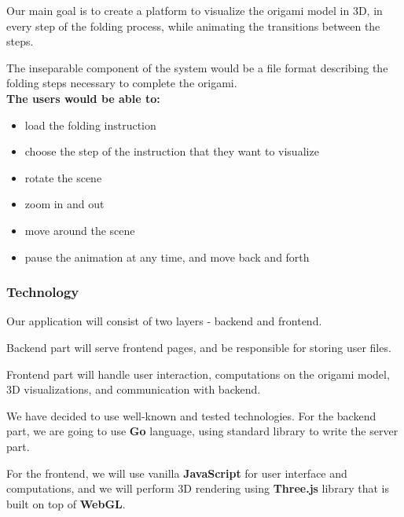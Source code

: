Our main goal is to create a platform to visualize the origami model in 3D,
in every step of the folding process, while animating the transitions between the steps.

The inseparable component of the system would be a file format describing the folding steps necessary to complete the origami.\\

\noindent \textbf{The users would be able to:}
\begin{itemize}
	\item load the folding instruction
	\item choose the step of the instruction that they want to visualize
	\item rotate the scene
    \item zoom in and out
	\item move around the scene
	\item pause the animation at any time, and move back and forth
\end{itemize}

\subsubsection{Technology}

Our application will consist of two layers - backend and frontend.

Backend part will serve frontend pages, and be responsible
for storing user files.

Frontend part will handle user interaction, computations on the origami model,
3D visualizations, and communication with backend.

We have decided to use well-known and tested technologies.
For the backend part, we are going to use \textbf{Go} language,
using standard library to write the server part.

For the frontend, we will use vanilla \textbf{JavaScript}
for user interface and computations,
and we will perform 3D rendering using \textbf{Three.js} library
that is built on top of \textbf{WebGL}.

